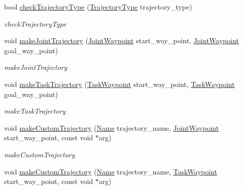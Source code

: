 \begin{DoxyCompactItemize}
bool \hyperlink{classrobotis__manipulator_1_1_trajectory_ad611b4f48e92be9c112c36cc2569bb75}{check\+Trajectory\+Type} (\hyperlink{namespacerobotis__manipulator_a008c110bef924df2737c5583000a9293}{Trajectory\+Type} trajectory\+\_\+type)
\begin{DoxyCompactList}\small\item\em check\+Trajectory\+Type \end{DoxyCompactList}\item 
void \hyperlink{classrobotis__manipulator_1_1_trajectory_a2cd72b326825ebcda3bdf2d52389e30f}{make\+Joint\+Trajectory} (\hyperlink{namespacerobotis__manipulator_a4456fd8b14e1f6b7733a77837dfe9339}{Joint\+Waypoint} start\+\_\+way\+\_\+point, \hyperlink{namespacerobotis__manipulator_a4456fd8b14e1f6b7733a77837dfe9339}{Joint\+Waypoint} goal\+\_\+way\+\_\+point)
\begin{DoxyCompactList}\small\item\em make\+Joint\+Trajectory \end{DoxyCompactList}\item 
void \hyperlink{classrobotis__manipulator_1_1_trajectory_a5d93fd05d5c8faa50286fc9b2c662744}{make\+Task\+Trajectory} (\hyperlink{namespacerobotis__manipulator_a440e2d88ec85fdee394e540dc6024c3e}{Task\+Waypoint} start\+\_\+way\+\_\+point, \hyperlink{namespacerobotis__manipulator_a440e2d88ec85fdee394e540dc6024c3e}{Task\+Waypoint} goal\+\_\+way\+\_\+point)
\begin{DoxyCompactList}\small\item\em make\+Task\+Trajectory \end{DoxyCompactList}\item 
void \hyperlink{classrobotis__manipulator_1_1_trajectory_a99cb5270c06f500744da8bb65547581b}{make\+Custom\+Trajectory} (\hyperlink{namespacerobotis__manipulator_a08c2d25e77a01ad75b9bb740f8ce4765}{Name} trajectory\+\_\+name, \hyperlink{namespacerobotis__manipulator_a4456fd8b14e1f6b7733a77837dfe9339}{Joint\+Waypoint} start\+\_\+way\+\_\+point, const void $\ast$arg)
\begin{DoxyCompactList}\small\item\em make\+Custom\+Trajectory \end{DoxyCompactList}\item 
void \hyperlink{classrobotis__manipulator_1_1_trajectory_af9e0f7972639f216f9ee5b31a0032218}{make\+Custom\+Trajectory} (\hyperlink{namespacerobotis__manipulator_a08c2d25e77a01ad75b9bb740f8ce4765}{Name} trajectory\+\_\+name, \hyperlink{namespacerobotis__manipulator_a440e2d88ec85fdee394e540dc6024c3e}{Task\+Waypoint} start\+\_\+way\+\_\+point, const void $\ast$arg)

\end{DoxyCompactItemize}
